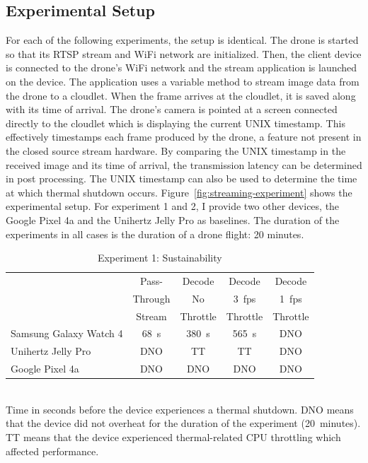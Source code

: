 \subsection{Experimental Setup}
\label{sec:streaming-experiment-setup}
For each of the following experiments, the setup is identical. The drone is started so that its RTSP stream and WiFi network are initialized. Then, the client device is connected to the drone’s WiFi network and the stream application is launched on the device. The application uses a variable method to stream image data from the drone to a cloudlet. When the frame arrives at the cloudlet, it is saved along with its time of arrival. The drone’s camera is pointed at a screen connected directly to the cloudlet which is displaying the current UNIX timestamp. This effectively timestamps each frame produced by the drone, a feature not present in the closed source stream hardware. By comparing the UNIX timestamp in the received image and its time of arrival, the transmission latency can be determined in post processing. The UNIX timestamp can also be used to determine the time at which thermal shutdown occurs. Figure~\ref{fig:streaming-experiment} shows the experimental setup. For experiment 1 and 2, I provide two other devices, the Google Pixel 4a and the Unihertz Jelly Pro as baselines. The duration of the experiments in all cases is the duration of a drone flight: 20 minutes.

\begin{table}
\centering
\begin{tabular}{|l|c|c|c|c|}
\hline
    & Pass- & Decode & Decode & Decode \\
    & Through & No & 3~fps & 1~fps \\
    & Stream & Throttle & Throttle & Throttle \\
\hline
Samsung Galaxy Watch 4 & \cellcolor{red!20}68~s & \cellcolor{red!20}380~s & \cellcolor{red!20}565~s & \cellcolor{green!20}DNO \\[0.1cm]
\hline
Unihertz Jelly Pro & \cellcolor{green!20}DNO & \cellcolor{red!20}TT & \cellcolor{red!20}TT & \cellcolor{green!20}DNO  \\[0.1cm]
\hline
Google Pixel 4a & \cellcolor{green!20}DNO & \cellcolor{green!20}DNO & \cellcolor{green!20}DNO & \cellcolor{green!20}DNO \\[0.1cm]
\hline
\end{tabular}
    \begin{captext}
    \\[0.1cm] \small Time in seconds before the device experiences a thermal shutdown. DNO means that the device did not overheat for the duration of the experiment (20~minutes). TT means that the device experienced thermal-related CPU throttling which affected performance.
    \end{captext}
\caption{Experiment 1: Sustainability}
\label{tab:time-before-overheating}
\end{table}

